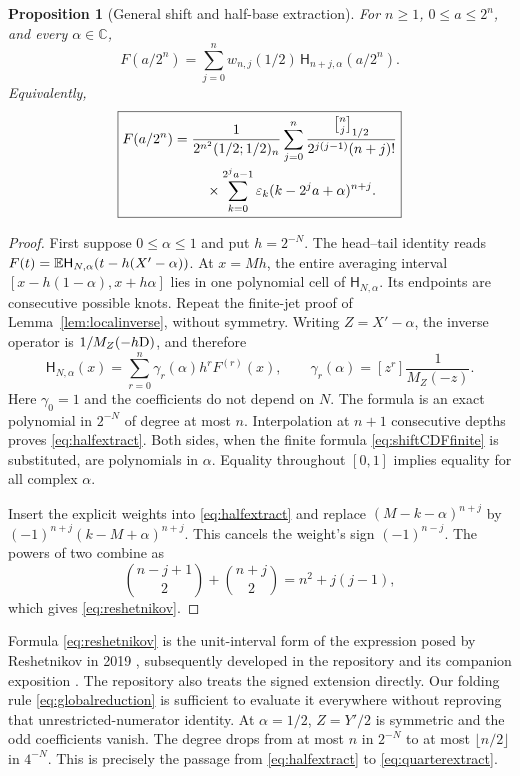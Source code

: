 \documentclass[11pt,oneside]{article}
\newtheorem{proposition}[theorem]{Proposition}
\theoremstyle{definition}\newtheorem{definition}[theorem]{Definition}
\theoremstyle{remark}\newtheorem{remark}[theorem]{Remark}
\newcommand{\C}{\mathbb C}\newcommand{\N}{\mathbb N}
\newcommand{\qbinom}[3]{\genfrac{[}{]}{0pt}{}{#1}{#2}_{#3}}
\begin{document}
\begin{proposition}[General shift and half-base extraction]
\label{prop:halfbase}
For $n\ge1$, $0\le a\le2^n$, and every $\alpha\in\C$,
\begin{equation}
 F(a/2^n)=\sum_{j=0}^{n}w_{n,j}(1/2)\,
                   \mathsf H_{n+j,\alpha}(a/2^n).
 \label{eq:halfextract}
\end{equation}
Equivalently,
\begin{equation}
 \boxed{\begin{aligned}
 F(a/2^n)={}&\frac{1}{2^{n^2}(1/2;1/2)_n}
 \sum_{j=0}^{n}
 \frac{\qbinom{n}{j}{1/2}}{2^{j(j-1)}(n+j)!}\\[-0.1em]
 &\hspace{1em}\times
 \sum_{k=0}^{2^ja-1}\eps_k(k-2^ja+\alpha)^{n+j}.
 \end{aligned}}
 \label{eq:reshetnikov}
\end{equation}
\end{proposition}
\begin{proof}
First suppose $0\le\alpha\le1$ and put $h=2^{-N}$.
The head--tail identity reads
$F(t)=\mathbb E\mathsf H_{N,\alpha}(t-h(X'-\alpha))$.
At $x=Mh$, the entire averaging interval
$[x-h(1-\alpha),x+h\alpha]$ lies in one polynomial cell of
$\mathsf H_{N,\alpha}$. Its endpoints are consecutive possible knots.
Repeat the finite-jet proof of Lemma~\ref{lem:localinverse}, without symmetry.
Writing $Z=X'-\alpha$, the inverse operator is
$1/M_Z(-h\mathrm D)$, and therefore
\[
 \mathsf H_{N,\alpha}(x)=\sum_{r=0}^{n}
 \gamma_r(\alpha)h^rF^{(r)}(x),\qquad
 \gamma_r(\alpha)=[z^r]\frac1{M_Z(-z)}.
\]
Here $\gamma_0=1$ and the coefficients do not depend on $N$.
The formula is an exact polynomial in $2^{-N}$ of degree at most $n$.
Interpolation at $n+1$ consecutive depths proves \eqref{eq:halfextract}.
Both sides, when the finite formula \eqref{eq:shiftCDFfinite} is substituted,
are polynomials in $\alpha$. Equality throughout $[0,1]$ implies equality
for all complex $\alpha$.

Insert the explicit weights into \eqref{eq:halfextract} and replace
$(M-k-\alpha)^{n+j}$ by $(-1)^{n+j}(k-M+\alpha)^{n+j}$.
This cancels the weight's sign $(-1)^{n-j}$. The powers of two combine as
\[
 \binom{n-j+1}{2}+\binom{n+j}{2}=n^2+j(j-1),
\]
which gives \eqref{eq:reshetnikov}.
\end{proof}

Formula \eqref{eq:reshetnikov} is the unit-interval form of the expression
posed by Reshetnikov in 2019 \cite{reshetnikov2019}, subsequently developed
in the repository and its companion exposition \cite{repo,webcompanion}.
The repository also treats the signed extension directly. Our folding rule
\eqref{eq:globalreduction} is sufficient to evaluate it everywhere without
reproving that unrestricted-numerator identity.
At $\alpha=1/2$, $Z=Y'/2$ is symmetric and the odd coefficients vanish.
The degree drops from at most $n$ in $2^{-N}$ to at most
$\lfloor n/2\rfloor$ in $4^{-N}$. This is precisely the passage from
\eqref{eq:halfextract} to \eqref{eq:quarterextract}.
\end{document}
